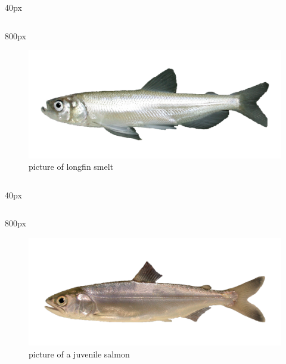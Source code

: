 \documentclass[
]{book}
\begin{document}
\begin{column}{40px\textwidth}
~
\end{column}

\begin{column}{800px\textwidth}
\begin{figure}

{\centering \includegraphics[width=29.17in]{figures/longfin_smelt_adult} 

}

\caption{picture of longfin smelt}\label{fig:unnamed-chunk-41}
\end{figure}
\end{column}

\begin{column}{40px\textwidth}
~
\end{column}

\begin{column}{800px\textwidth}
\begin{figure}

{\centering \includegraphics[width=29.17in]{figures/chinook_salmon_smolt} 

}

\caption{picture of a juvenile salmon}\label{fig:unnamed-chunk-42}
\end{figure}
\end{column}
\end{document}
